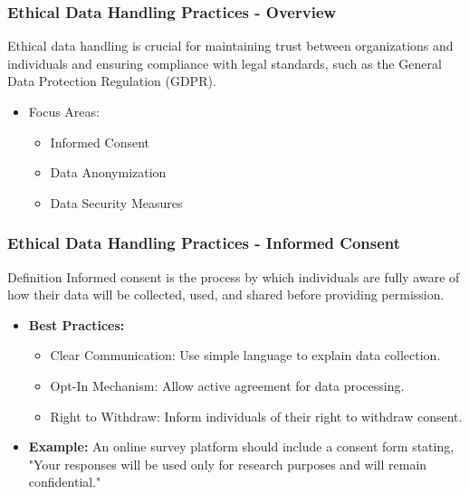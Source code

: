\documentclass[aspectratio=169]{beamer}
\begin{document}
\begin{frame}[fragile]
  \frametitle{Ethical Data Handling Practices - Overview}
  Ethical data handling is crucial for maintaining trust between organizations and individuals and ensuring compliance with legal standards, such as the General Data Protection Regulation (GDPR).
  
  \begin{itemize}
    \item Focus Areas:
      \begin{itemize}
        \item Informed Consent
        \item Data Anonymization
        \item Data Security Measures
      \end{itemize}
  \end{itemize}
\end{frame}

\begin{frame}[fragile]
  \frametitle{Ethical Data Handling Practices - Informed Consent}
  \begin{block}{Definition}
    Informed consent is the process by which individuals are fully aware of how their data will be collected, used, and shared before providing permission.
  \end{block}

  \begin{itemize}
    \item \textbf{Best Practices:}
      \begin{itemize}
        \item Clear Communication: Use simple language to explain data collection.
        \item Opt-In Mechanism: Allow active agreement for data processing.
        \item Right to Withdraw: Inform individuals of their right to withdraw consent.
      \end{itemize}
    
    \item \textbf{Example:} 
      An online survey platform should include a consent form stating, "Your responses will be used only for research purposes and will remain confidential."
  \end{itemize}
\end{frame}
\end{document}
